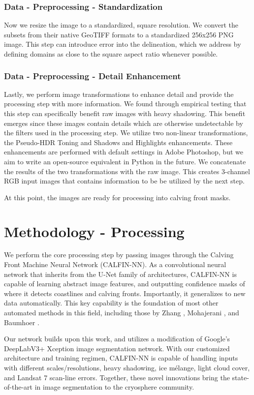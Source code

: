 \documentclass[tc, manuscript]{copernicus}
\begin{document}
\subsubsection{Data - Preprocessing - Standardization}
Now we resize the image to a standardized, square resolution. We convert the subsets from their native GeoTIFF formats to a standardized 256x256 PNG image. This step can introduce error into the delineation, which we address by defining domains as close to the square aspect ratio whenever possible.

\subsubsection{Data - Preprocessing - Detail Enhancement}
Lastly, we perform image transformations to enhance detail and provide the processing step with more information. We found through empirical testing that this step can specifically benefit raw images with heavy shadowing. This benefit emerges since these images contain details which are otherwise undetectable by the filters used in the processing step. We utilize two non-linear transformations, the Pseudo-HDR Toning and Shadows and Highlights enhancements. These enhancements are performed with default settings in Adobe Photoshop, but we aim to write an open-source equivalent in Python in the future. We concatenate the results of the two transformations with the raw image. This creates 3-channel RGB input images that contains information to be be utilized by the next step. 

At this point, the images are ready for processing into calving front masks.


\section{Methodology - Processing}
We perform the core processing step by passing images through the Calving Front Machine Neural Network (CALFIN-NN). As a convolutional neural network that inherits from the U-Net family of architectures, CALFIN-NN is capable of learning abstract image features, and outputting confidence masks of where it detects coastlines  and calving fronts. Importantly, it generalizes to new data automatically. This key capability is the foundation of most other automated methods in this field, including those by Zhang \citep{zhang2019}, Mohajerani \citep{mohajerani2019}, and Baumhoer \citep{baumhoer2019}.

Our network builds upon this work, and utilizes a modification of Google's DeepLabV3+ Xception \citep{chen2018} image segmentation network. With our customized architecture and training regimen, CALFIN-NN is capable of handling inputs with different scales/resolutions, heavy shadowing, ice mélange, light cloud cover, and Landsat 7 scan-line errors. Together, these novel innovations bring the state-of-the-art in image segmentation to the cryosphere community.
\end{document}
